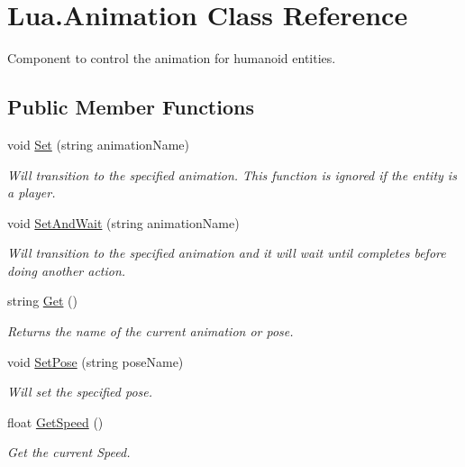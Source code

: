 \hypertarget{class_lua_1_1_animation}{}\section{Lua.\+Animation Class Reference}
\label{class_lua_1_1_animation}


Component to control the animation for humanoid entities.  


\subsection*{Public Member Functions}
\begin{DoxyCompactItemize}
\item 
void \mbox{\hyperlink{class_lua_1_1_animation_a27ca2f8a6b74867c4727315bbce3878f}{Set}} (string animation\+Name)
\begin{DoxyCompactList}\small\item\em Will transition to the specified animation. This function is ignored if the entity is a player. \end{DoxyCompactList}\item 
void \mbox{\hyperlink{class_lua_1_1_animation_afbab459005c0736f8b52459185cf1637}{Set\+And\+Wait}} (string animation\+Name)
\begin{DoxyCompactList}\small\item\em Will transition to the specified animation and it will wait until completes before doing another action. \end{DoxyCompactList}\item 
string \mbox{\hyperlink{class_lua_1_1_animation_afa4d0d4dc374917da05e5c26e75c20b0}{Get}} ()
\begin{DoxyCompactList}\small\item\em Returns the name of the current animation or pose. \end{DoxyCompactList}\item 
void \mbox{\hyperlink{class_lua_1_1_animation_ad3fe96a39d87c9f3b1121fbbd05f61ea}{Set\+Pose}} (string pose\+Name)
\begin{DoxyCompactList}\small\item\em Will set the specified pose. \end{DoxyCompactList}\item 
float \mbox{\hyperlink{class_lua_1_1_animation_ac615b08b06a84330cddb327e6d28f6c9}{Get\+Speed}} ()
\begin{DoxyCompactList}\small\item\em Get the current Speed. \end{DoxyCompactList}\item 

\end{DoxyCompactItemize}

